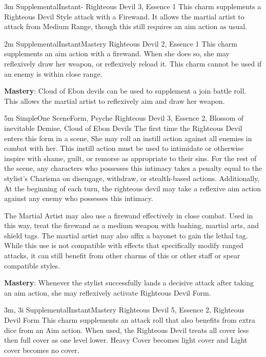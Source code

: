 
{3m}
{Supplemental}{Instant}{-}
{Righteous Devil 3, Essence 1}
This charm supplements a Righteous Devil Style attack with a Firewand.
It allows the martial artist to attack from Medium Range, though this still requires an aim action as usual.

{2m}
{Supplemental}{Instant}{Mastery}
{Righteous Devil 2, Essence 1}
This charm supplements an aim action with a firewand.
When she does so, she may reflexively draw her weapon, or reflexively reload it.
This charm cannot be used if an enemy is within close range.

\textbf{Mastery}: Cloud of Ebon devils can be used to supplement a join battle roll.
This allows the martial artist to reflexively aim and draw her weapon.

 
{5m}
{Simple}{One Scene}{Form, Psyche}
{Righteous Devil 3, Essence 2, Blossom of inevitable Demise, Cloud of Ebon Devils}
The first time the Righteous Devil enters this form in a scene,
She may roll an instill action against all enemies in combat with her.
This instill action must be used to intimidate or otherwise inspire with shame, guilt, or remorse as appropriate to their sins.
For the rest of the scene, any characters who possesses this intimacy takes a penalty equal to the stylist's Charisma on disengage, withdraw, or stealth-based actions.
Additionally, At the beginning of each turn, the righteous devil may take a reflexive aim action against any enemy who possesses this intimacy.

The Martial Artist may also use a firewand effectively in close combat.
Used in this way, treat the firewand as a medium weapon with bashing, martial arts, and shield tags.
The martial artist may also affix a bayonet to gain the lethal tag.
While this use is not compatible with effects that specifically modify ranged attacks, it can still benefit from other charms of this or other staff or spear compatible styles.

\textbf{Mastery}: Whenever the stylist successfully lands a decisive attack after taking an aim action,
she may reflexively activate Righteous Devil Form.

{3m, 3i}
{Supplemental}{Instant}{Mastery}
{Righteous Devil 5, Essence 2, Righteous Devil Form}
This charm supplements an attack roll that also benefits from extra dice from an Aim action.
When used, the Righteous Devil treats all cover less then full cover as one level lower.
Heavy Cover becomes light cover and Light cover becomes no cover.


